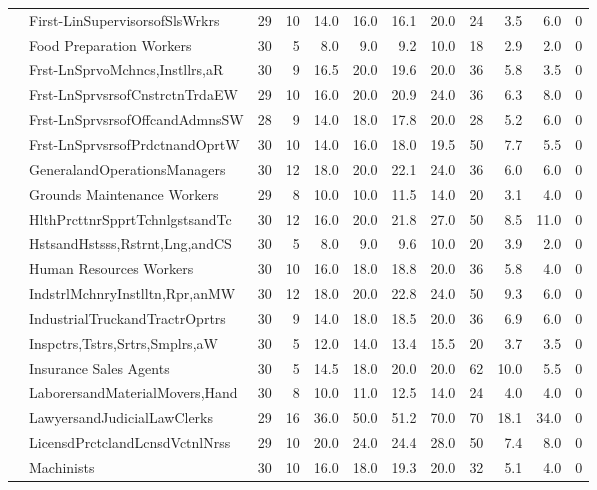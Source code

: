 {\begin{longtable}{llrrrrrrrrrr}
   & First-LinSupervisorsofSlsWrkrs &   29 & 10 & 14.0 & 16.0 & 16.1 & 20.0 & 24 &  3.5 &  6.0 & 0 \\ 
   & Food Preparation Workers &   30 &  5 &  8.0 &  9.0 &  9.2 & 10.0 & 18 &  2.9 &  2.0 & 0 \\ 
   & Frst-LnSprvoMchncs,Instllrs,aR &   30 &  9 & 16.5 & 20.0 & 19.6 & 20.0 & 36 &  5.8 &  3.5 & 0 \\ 
   & Frst-LnSprvsrsofCnstrctnTrdaEW &   29 & 10 & 16.0 & 20.0 & 20.9 & 24.0 & 36 &  6.3 &  8.0 & 0 \\ 
   & Frst-LnSprvsrsofOffcandAdmnsSW &   28 &  9 & 14.0 & 18.0 & 17.8 & 20.0 & 28 &  5.2 &  6.0 & 0 \\ 
   & Frst-LnSprvsrsofPrdctnandOprtW &   30 & 10 & 14.0 & 16.0 & 18.0 & 19.5 & 50 &  7.7 &  5.5 & 0 \\ 
   & GeneralandOperationsManagers &   30 & 12 & 18.0 & 20.0 & 22.1 & 24.0 & 36 &  6.0 &  6.0 & 0 \\ 
   & Grounds Maintenance Workers &   29 &  8 & 10.0 & 10.0 & 11.5 & 14.0 & 20 &  3.1 &  4.0 & 0 \\ 
   & HlthPrcttnrSpprtTchnlgstsandTc &   30 & 12 & 16.0 & 20.0 & 21.8 & 27.0 & 50 &  8.5 & 11.0 & 0 \\ 
   & HstsandHstsss,Rstrnt,Lng,andCS &   30 &  5 &  8.0 &  9.0 &  9.6 & 10.0 & 20 &  3.9 &  2.0 & 0 \\ 
   & Human Resources Workers &   30 & 10 & 16.0 & 18.0 & 18.8 & 20.0 & 36 &  5.8 &  4.0 & 0 \\ 
   & IndstrlMchnryInstlltn,Rpr,anMW &   30 & 12 & 18.0 & 20.0 & 22.8 & 24.0 & 50 &  9.3 &  6.0 & 0 \\ 
   & IndustrialTruckandTractrOprtrs &   30 &  9 & 14.0 & 18.0 & 18.5 & 20.0 & 36 &  6.9 &  6.0 & 0 \\ 
   & Inspctrs,Tstrs,Srtrs,Smplrs,aW &   30 &  5 & 12.0 & 14.0 & 13.4 & 15.5 & 20 &  3.7 &  3.5 & 0 \\ 
   & Insurance Sales Agents &   30 &  5 & 14.5 & 18.0 & 20.0 & 20.0 & 62 & 10.0 &  5.5 & 0 \\ 
   & LaborersandMaterialMovers,Hand &   30 &  8 & 10.0 & 11.0 & 12.5 & 14.0 & 24 &  4.0 &  4.0 & 0 \\ 
   & LawyersandJudicialLawClerks &   29 & 16 & 36.0 & 50.0 & 51.2 & 70.0 & 70 & 18.1 & 34.0 & 0 \\ 
   & LicensdPrctclandLcnsdVctnlNrss &   29 & 10 & 20.0 & 24.0 & 24.4 & 28.0 & 50 &  7.4 &  8.0 & 0 \\ 
   & Machinists &   30 & 10 & 16.0 & 18.0 & 19.3 & 20.0 & 32 &  5.1 &  4.0 & 0 \\ 

\end{longtable}}
